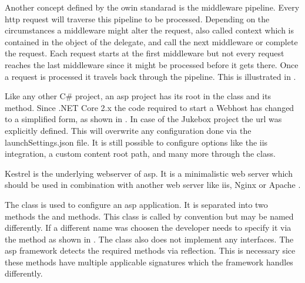Another concept defined by the \gls{owin} standarad is the middleware pipeline. Every \gls{http} request will traverse this pipeline to be processed. Depending on the circumstances a middleware might alter the request, also called context which is contained in the  object of the delegate, and call the next middleware or complete the request. Each request starts at the first middleware but not every request reaches the last middleware since it might be processed before it gets there. Once a request is processed it travels back through the pipeline. This is illustrated in .



Like any other C\# project, an \gls{asp} project has its root in the  class and its  method. Since .NET Core 2.x the code required to start a Webhost has changed to a simplified form, as shown in  \cite{aspFundamentals}. In case of the Jukebox project the \gls{url} was explicitly defined. This will overwrite any configuration done via the launchSettings.json file. It is still possible to configure options like the \gls{iis} integration, a custom content root path, and many more through the  class.


Kestrel is the underlying webserver of \gls{asp}. It is a minimalistic web server which should be used in combination with another web server like \gls{iis}, Nginx or Apache \cite{kestrel}.


The  class is used to configure an \gls{asp} application. It is separated into two methods the  and  methods. This class is called  by convention but may be named differently. If a different name was choosen the developer needs to specify it via the  method as shown in . The  class also does not implement any interfaces. The \gls{asp} framework detects the required methods via reflection. This is necessary sice these methods have multiple applicable signatures which the framework handles differently.

